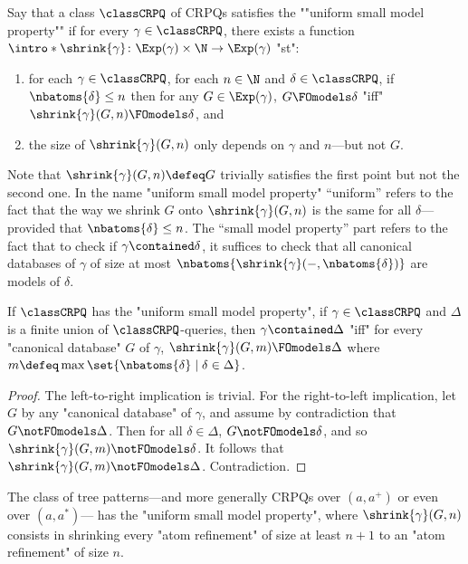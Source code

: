 Say that a class $\classCRPQ$ of CRPQs satisfies the \AP""uniform small model property""
if for every $\gamma \in \classCRPQ$, there exists a function
$\intro*\shrink{\gamma}\colon \Exp(\gamma) \times \N \to \Exp(\gamma)$ "st":
\begin{enumerate}
  \item for each $\gamma \in \classCRPQ$, for each $n \in \N$ and $\delta \in \classCRPQ$,
  if $\nbatoms{\delta} \leq n$ then for any $G \in \Exp(\gamma)$, $G \FOmodels \delta$ "iff"
  $\shrink{\gamma}(G, n) \FOmodels \delta$, and
  \item the size of $\shrink{\gamma}(G, n)$ only depends on $\gamma$ and $n$---but not $G$.
\end{enumerate} 
Note that $\shrink{\gamma}(G, n) \defeq G$ trivially satisfies the first point but not the second one.
In the name "uniform small model property" ``uniform'' refers to the fact
that the way we shrink $G$ onto $\shrink{\gamma}(G,n)$ is the same for all $\delta$---provided that $\nbatoms{\delta} \leq n$. The ``small model property'' part refers to the fact that to check if
$\gamma \contained \delta$, it suffices to check that all canonical databases of $\gamma$
of size at most $\nbatoms{\shrink{\gamma}(-, \nbatoms{\delta})}$ are models of $\delta$.

\begin{proposition}
  \AP\label{prop:containment-uniform-smp}
  If $\classCRPQ$ has the "uniform small model property", if $\gamma \in \classCRPQ$ and $\Delta$ 
  is a finite union of $\classCRPQ$-queries, then
  $\gamma \contained \Delta$ "iff" for every "canonical database" $G$ of $\gamma$,
  $\shrink{\gamma}(G, m) \FOmodels \Delta$
  where $m \defeq \max{\set{\nbatoms{\delta} \mid \delta \in \Delta}}$.
\end{proposition}

\begin{proof}
  The left-to-right implication is trivial. For the right-to-left implication, 
  let $G$ by any "canonical database" of $\gamma$,
  and assume by contradiction that $G \notFOmodels \Delta$.
  Then for all $\delta \in \Delta$, $G \notFOmodels \delta$,
  and so $\shrink{\gamma}(G, m) \notFOmodels \delta$.
  It follows that $\shrink{\gamma}(G, m) \notFOmodels \Delta$.
  Contradiction.
\end{proof}

\begin{proposition}
  \AP\label{prop:tree-patterns-uniform-smp}
  The class of tree patterns---and more generally CRPQs over $(a, a^+)$ or even over $(a, a^*)$---
  has the "uniform small model property", where $\shrink{\gamma}(G, n)$ consists
  in shrinking every "atom refinement" of size at least $n+1$ to an "atom refinement" of
  size $n$.
\end{proposition}

